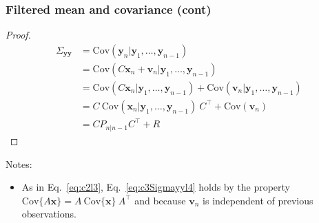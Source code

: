\begin{frame}
    \frametitle{Filtered mean and covariance (cont)}
    \scriptsize

    \begin{proof}\renewcommand{\qedsymbol}{}
    \begin{align}
        \Sigma_{\mathbf{y}\mathbf{y}}&=\text{Cov}(\mathbf{y}_n|\mathbf{y}_1,\ldots,\mathbf{y}_{n-1})\nonumber\\
                                     &=\text{Cov}(C\mathbf{x}_n+\mathbf{v}_n|\mathbf{y}_1,\ldots,\mathbf{y}_{n-1})\nonumber\\
                                     &=\text{Cov}(C\mathbf{x}_n|\mathbf{y}_1,\ldots,\mathbf{y}_{n-1})+\text{Cov}(\mathbf{v}_n|\mathbf{y}_1,\ldots,\mathbf{y}_{n-1})\nonumber\\
                                     &=C\ \text{Cov}(\mathbf{x}_n|\mathbf{y}_1,\ldots,\mathbf{y}_{n-1})\ C^\intercal+\text{Cov}(\mathbf{v}_n)\label{eq:c3Sigmayyl4}\\
                                     &=CP_{n|n-1}C^\intercal+R\label{eq:sigmayy}
    \end{align}
    \end{proof}

Notes:

\begin{itemize}

    \item As in Eq.~\ref{eq:c2l3}, Eq.~\ref{eq:c3Sigmayyl4} holds by the
        property
        $\text{Cov}\{A\mathbf{x}\}=A\ \text{Cov}\{\mathbf{x}\}\ A^\intercal$ and
        because $\mathbf{v}_n$ is independent of previous observations.

\end{itemize}
\end{frame}

